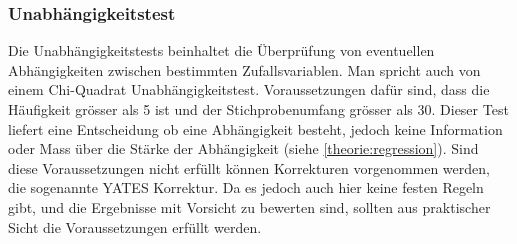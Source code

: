\subsubsection{Unabhängigkeitstest}
Die Unabhängigkeitstests beinhaltet die Überprüfung von eventuellen Abhängigkeiten zwischen bestimmten Zufallsvariablen. Man spricht auch von einem Chi-Quadrat Unabhängigkeitstest. Voraussetzungen dafür sind, dass die Häufigkeit grösser als 5 ist und der Stichprobenumfang grösser als 30. Dieser Test liefert eine Entscheidung ob eine Abhängigkeit besteht, jedoch keine Information oder Mass über die Stärke der Abhängigkeit (siehe \autoref{theorie:regression}). Sind diese Voraussetzungen nicht erfüllt können Korrekturen vorgenommen werden, die sogenannte YATES Korrektur. Da es jedoch auch hier keine festen Regeln gibt, und die Ergebnisse mit Vorsicht zu bewerten sind, sollten aus praktischer Sicht die Voraussetzungen erfüllt werden.
